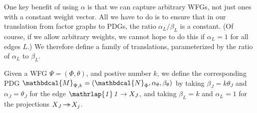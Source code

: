 \documentclass[letterpaper]{article} %
\theoremstyle{plain}
\theoremstyle{definition}
\theoremstyle{remark}
\newcommand{\tto}{\rightarrow\mathrel{\mspace{-15mu}}\rightarrow}
\newcommand{\dg}[1]{\mathbdcal{#1}}
\newcommand{\pdgunit}{\mathrlap{\mathit 1} \mspace{2.3mu}\mathit 1}
\newcommand{\PDGof}[1]{{\dg M}_{#1}}
\newcommand{\UPDGof}[1]{{\dg N}_{#1}}
\begin{document}
One key benefit of using $\alpha$ is that we can
capture arbitrary WFGs, not just ones with a constant weight
vector.    All we have to do is to ensure that in our translation from
factor graphs to PDGs, the ratio $\alpha_L/\beta_L$ is a
constant.  (Of course, if we allow arbitrary weights, we cannot hope
to do this if $\alpha_L = 1$ for all edges $L$.)  
We therefore define a family of translations, parameterized by the
ratio of $\alpha_L$ to $\beta_L$.
\begin{defn}\label{def:wfg2pdg}
Given a WFG
$\Psi=(\Phi, \theta)$,
and postive number $k$, 
we define the corresponding PDG $\PDGof{\Psi,k} = (\UPDGof{\Phi},\alpha_{\theta}, \beta_{\theta})$ 
by taking $\beta_J = k \theta_J$ and $\alpha_J = \theta_J$ for the edge
 $\pdgunit  \rightarrow X_J$, and
taking $\beta_L = k$ and $\alpha_L = 1$ for the projections $X_J \!\tto\! X_j$.
\end{defn}
\end{document}

